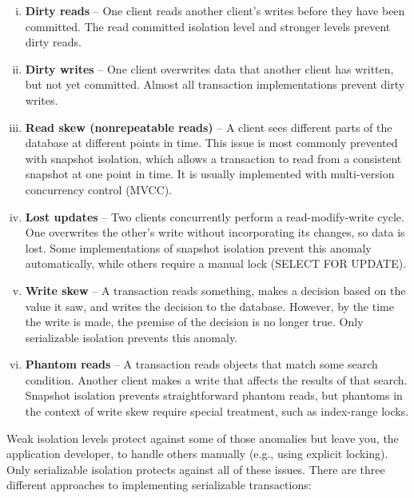 \documentclass{article}
\begin{document}
    \begin{enumerate}[i.]
        \item \textbf{Dirty reads} -- One client reads another client’s writes before they have been committed. The read committed isolation level and stronger levels prevent dirty reads.
        
        \item \textbf{Dirty writes} -- One client overwrites data that another client has written, but not yet committed. Almost all transaction implementations prevent dirty writes.
        
        \item \textbf{Read skew (nonrepeatable reads)} -- A client sees different parts of the database at different points in time. This issue is most commonly prevented with snapshot isolation, which allows a transaction   to read from a consistent snapshot at one point in time. It is usually implemented with multi-version concurrency control (MVCC).
        
        \item \textbf{Lost updates} -- Two clients concurrently perform a read-modify-write cycle. One overwrites the other’s write without incorporating its changes, so data is lost. Some implementations of snapshot isolation prevent this anomaly automatically, while others require a manual lock (SELECT FOR UPDATE).
        
        \item \textbf{Write skew} -- A transaction reads something, makes a decision based on the value it saw, and writes the decision to the database. However, by the time the write is made, the premise of the decision is no longer true. Only serializable isolation prevents this  anomaly.
        
        \item \textbf{Phantom reads} -- A transaction reads objects that match some search condition. Another client makes a write that affects the results of that search. Snapshot isolation prevents straightforward phantom reads, but phantoms in the context of write skew require special treatment, such as index-range locks.
    \end{enumerate}
    
    Weak isolation levels protect against some of those anomalies but leave you, the application developer, to handle others manually (e.g., using explicit locking). Only serializable isolation protects against all of these issues. There are three different approaches to implementing serializable transactions:
    
\end{document}
